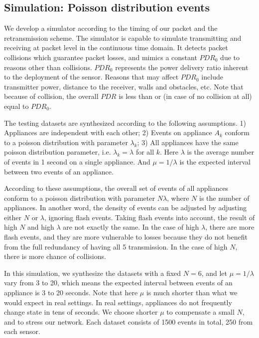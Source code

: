 \subsection{Simulation: Poisson distribution events}

We develop a simulator according to the timing of our packet and the retransmission scheme. The simulator is capable to simulate transmitting and receiving at packet level in the continuous time domain. It detects packet collisions which guarantee packet losses, and mimics a constant $PDR_0$ due to reasons other than collisions. $PDR_0$ represents the power delivery ratio inherent to the deployment of the sensor. Reasons that may affect $PDR_0$ include transmitter power, distance to the receiver, walls and obstacles, etc. Note that because of collision, the overall $PDR$ is less than or (in case of no collision at all) equal to $PDR_0$. 

The testing datasets are synthesized according to the following assumptions. 1) Appliances are independent with each other; 2) Events on appliance $A_k$ conform to a poisson distribution with parameter $\lambda_k$; 3) All appliances have the same poisson distribution parameter, i.e. $\lambda_k = \lambda$ for all $k$. Here $\lambda$ is the average number of events in 1 second on a single appliance. And $\mu = 1/\lambda$ is the expected interval between two events of an appliance. 

According to these assumptions, the overall set of events of all appliances conform to a poisson distribution with parameter $N\lambda$, where $N$ is the number of appliances. In another word, the density of events can be adjusted by adjusting either $N$ or $\lambda$, ignoring flash events. Taking flash events into account, the result of high $N$ and high $\lambda$ are not exactly the same. In the case of high $\lambda$, there are more flash events, and they are more vulnerable to losses because they do not benefit from the full redundancy of having all 5 transmission. In the case of high $N$, there is more chance of collisions. 

In this simulation, we synthesize the datasets with a fixed $N=6$, and let $\mu = 1/\lambda$ vary from 3 to 20, which means the expected interval between events of an appliance is 3 to 20 seconds. Note that here $\mu$ is much shorter than what we would expect in real settings. In real settings, appliances do not frequently change state in tens of seconds. We choose shorter $\mu$ to compensate a small $N$, and to stress our network. Each dataset consists of 1500 events in total, 250 from each sensor. 

